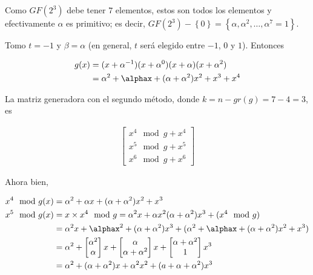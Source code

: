 \documentclass[a4paper]{article}
\begin{document}
Como $GF(2^3)$ debe tener $7$ elementos, estos son todos los elementos y
efectivamente $\alpha$ es primitivo; es decir, $GF(2^3) - \left\{ 0 \right\}
=\left\{ \alpha, \alpha^2, \ldots, \alpha^7 = 1 \right\}  $.

Tomo $t = - 1$ y $\beta = \alpha$ (en general, $t$ será elegido entre $-1$, $0$
y $1$). Entonces 

\begin{align*}
    g(x) &= (x + \alpha^{-1})(x+\alpha^0)(x+\alpha)(x + \alpha^2) \\ 
         &= \alpha^2 + \alphax + (\alpha + \alpha^2)x^2 + x^3 + x^4
\end{align*}

La matriz generadora con el segundo método, donde $k = n - gr(g) = 7 - 4 = 3$,
es 

\begin{align*}
    \begin{bmatrix} 
        x^4 \mod g + x^4 \\ 
        x^5 \mod g + x^5 \\ 
        x^6 \mod g + x^6
    \end{bmatrix} 
\end{align*}

Ahora bien, 

\begin{align*}
    x^4 \mod g(x) &= \alpha^2 + \alpha x + (\alpha + \alpha^2)x^2 + x^3 \\ 
    x^5 \mod g(x) &= x \times x^4 \mod g = \alpha^2 x + \alpha x^2 (\alpha + \alpha^2)x^3 + (x^4 \mod g) \\ 
                  &= \alpha^2 x + \alphax^2 + (\alpha + \alpha^2)x^3 + (\alpha^2 + \alphax + (\alpha + \alpha^2)x^2 + x^3) \\ 
                  &= \alpha^2 + \begin{bmatrix} 
                          \alpha^2 \\ \alpha 
                  \end{bmatrix}  x + \begin{bmatrix} 
                          \alpha \\ \alpha + \alpha^2 
                  \end{bmatrix}  x + \begin{bmatrix} 
                          \alpha + \alpha^2  \\ 1
                  \end{bmatrix} x^3 \\ 
                  &= \alpha^2 + (\alpha + \alpha^2)x + \alpha^2 x^2 + (a + \alpha + \alpha^2)x^3
\end{align*}
\end{document}
